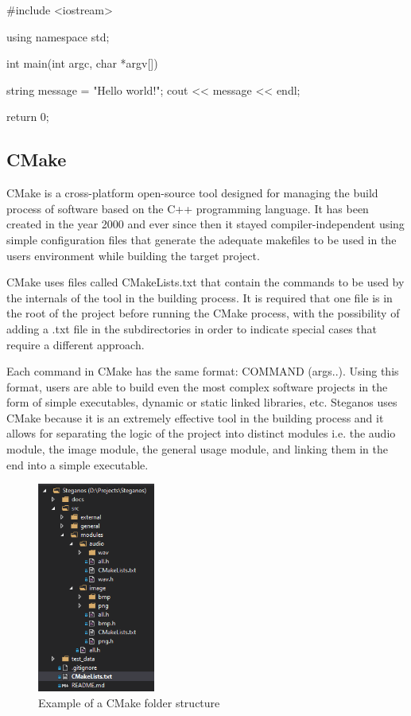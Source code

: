 \begin{multicols*}{2}
\begin{custom_listing}[language=C++]
#include <iostream>

using namespace std;

int main(int argc, char *argv[]) {
  string message = "Hello world!";
  cout << message << endl;

  return 0;
}
\end{custom_listing}

\subsection{CMake}
CMake is a cross-platform open-source tool designed for managing the build process of software based on the C++ programming language. It has been created in the year 2000 and ever since then it stayed compiler-independent using simple configuration files that generate the adequate makefiles to be used in the users environment while building the target project\cite{cmake-documentation}.

CMake uses files called CMakeLists.txt that contain the commands to be used by the internals of the tool in the building process. It is required that one file is in the root of the project before running the CMake process, with the possibility of adding a .txt file in the subdirectories in order to indicate special cases that require a different approach.



Each command in CMake has the same format: COMMAND (args..). Using this format, users are able to build even the most complex software projects in the form of simple executables, dynamic or static linked libraries, etc. Steganos uses CMake because it is an extremely effective tool in the building process and it allows for separating the logic of the project into distinct modules i.e. the audio module, the image module, the general usage module, and linking them in the end into a simple executable.

\begin{figure}[H]
    \centering
    \includegraphics[height=6.9cm,keepaspectratio]{pics/cmake_folder_structure_example}
    \caption{Example of a CMake folder structure}
\end{figure}



\end{multicols*}
